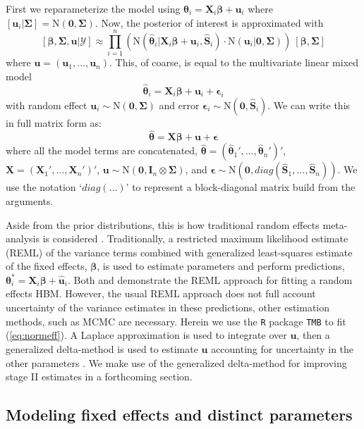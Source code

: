 \documentclass[12pt]{article}
\newcommand{\bt}{\boldsymbol{\theta}}
\newcommand{\bb}{\boldsymbol{\beta}}
\newcommand{\bSig}{\boldsymbol{\Sigma}}
\newcommand{\bS}{\mathbf{S}}
\newcommand{\bX}{\mathbf{X}}
\newcommand{\bu}{\mathbf{u}}
\newcommand{\tN}{\text{N}}
\newcommand{\bI}{\mathbf{I}}
\newcommand{\bz}{\mathbf{0}}
\begin{document}
First we reparameterize the model using $\bt_i = \bX_i\bb + \bu_i$ where $[\bu_i|\bSig] = \tN(\mathbf{0},\bSig)$. Now, the posterior of interest is approximated with
\begin{equation}
\label{eq:normeff}
[\bb,\bSig,\bu|\mathcal{Y}] \approx  \prod_{i=1}^n\left(\tN(\hat{\bt}_i|\bX_i\bb+\bu_i, \hat{\bS}_i)\cdot \tN(\bu_i|\mathbf{0},\bSig)\right)\ [\bb, \bSig]
\end{equation}
where $\bu = (\bu_1,\dots,\bu_n)$. This, of coarse, is equal to the multivariate linear mixed model
\[
\hat{\bt}_i = \bX_i\bb + \bu_i + \boldsymbol{\epsilon}_i
\]
with random effect $\bu_i \sim \text{N}(\mathbf{0},\bSig)$ and error $\boldsymbol{\epsilon}_i \sim \text{N}(\mathbf{0},\hat{\bS}_i)$. We can write this in full matrix form as:
\begin{equation}\label{eq:full.mat.form}
\hat{\bt} = \bX\bb + \bu + \boldsymbol{\epsilon}
\end{equation}
where all the model terms are concatenated, $\hat{\bt} = (\hat{\bt}_1',\dots,\hat{\bt}_n')'$, $\bX = (\bX_1',\dots,\bX_n')'$, $\bu \sim \tN(\bz, \bI_n\otimes\bSig)$, and $\boldsymbol{\epsilon} \sim \tN(\mathbf{0}, diag(\hat{\bS}_1,\dots,\hat{\bS}_n))$. We use the notation `$diag(\dots)$' to represent a block-diagonal matrix build from the arguments. 

Aside from the prior distributions, this is how traditional random effects meta-analysis is considered \cite{higgins2009re}. Traditionally, a restricted maximum likelihood estimate (REML) of the variance terms combined with generalized least-squares estimate of the fixed effects, $\bb$, is used to estimate parameters and perform predictions, $\bt^*_i = \bX_i\bb + \hat{\bu}_i$. Both \citet{burnham2002evaluation} and \cite{zeppelin2019migratory} demonstrate the REML approach for fitting a random effects HBM. However, the usual REML approach does not full account uncertainty of the variance estimates in these predictions, other estimation methods, such as MCMC are necessary. Herein we use the {\tt R} package {\tt TMB} to fit (\ref{eq:normeff}). A Laplace approximation is used to integrate over $\bu$, then a generalized delta-method is used to estimate $\bu$ accounting for uncertainty in the other parameters \citep{kristensen2016tmb}. We make use of the generalized delta-method for improving stage II estimates in a forthcoming section. 






\subsection{Modeling fixed effects and distinct parameters}
\end{document}
